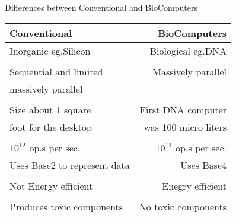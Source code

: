 \documentclass[10pt]{beamer}
\begin{document}
\begin{frame}{Differences between Conventional and BioComputers}
  \begin{table}
    \begin{tabular}{lr}
      \toprule
      Conventional & BioComputers \\
      \midrule
      Inorganic eg.Silicon & Biological eg.DNA \\ \\
      Sequential and limited &  Massively parallel\\
      massively parallel & \\ \\
      Size about 1 square  &  First DNA computer\\
      foot for the desktop & was 100 micro liters\\ \\
      $10^{12}$ op.s per sec. & $10^{14}$ op.s per sec.\\
    Uses Base2 to represent data & Uses Base4 \\ \\
      Not Energy efficient & Enegry efficient \\ \\
      Produces toxic components & No toxic components\\ 
      \bottomrule
    \end{tabular}
  \end{table}
\end{frame}
\end{document}
